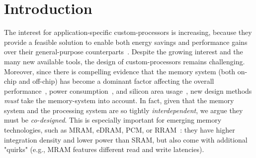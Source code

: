 \section{Introduction}
The interest for application-specific custom-processors is increasing, because they provide a feasible solution to enable both energy savings and performance gains over their general-purpose counterparts~\cite{hameed2010understanding}. %
Despite the growing interest and the many new available tools, the design of custom-processors remains challenging. Moreover, since there is compelling evidence that the memory system (both on-chip and off-chip) has become a dominant factor affecting the overall performance~\cite{williams2009roofline}, power consumption~\cite{dayarathna2015data}, and silicon area usage~\cite{oh2009analytical}, new design methods \textit{must} take the memory-system into account.   
In fact, given that the memory system and the processing system are so tightly \textit{interdependent}, we argue they must be \textit{co-designed}. This is especially important for emerging memory technologies, such as MRAM, eDRAM, PCM, or RRAM~\cite{mem2016}: they have higher integration density and lower power than SRAM, but also come with additional "quirks" (e.g., MRAM features different read and write latencies). 

%

